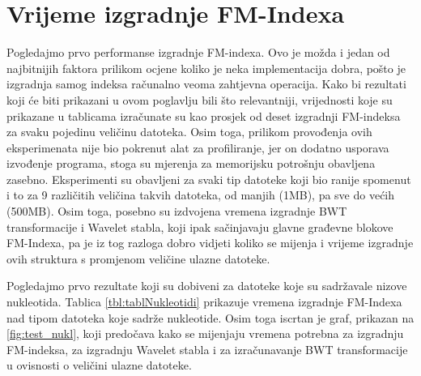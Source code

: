 \section{Vrijeme izgradnje FM-Indexa}
Pogledajmo prvo performanse izgradnje FM-indexa. Ovo je možda i jedan od najbitnijih faktora prilikom ocjene koliko je neka implementacija dobra, pošto je izgradnja samog indeksa računalno veoma zahtjevna operacija. Kako bi rezultati koji će biti prikazani u ovom poglavlju bili što relevantniji, vrijednosti koje su prikazane u tablicama izračunate su kao prosjek od deset izgradnji FM-indeksa za svaku pojedinu veličinu datoteka. Osim toga, prilikom provođenja ovih eksperimenata nije bio pokrenut alat za profiliranje, jer on dodatno usporava izvođenje programa, stoga su mjerenja za memorijsku potrošnju obavljena zasebno. Eksperimenti su obavljeni za svaki tip datoteke koji bio ranije spomenut i to za 9 različitih veličina takvih datoteka, od manjih (1MB), pa sve do većih (500MB). Osim toga, posebno su izdvojena vremena izgradnje BWT transformacije i Wavelet stabla, koji ipak sačinjavaju glavne građevne blokove FM-Indexa, pa je iz tog razloga dobro vidjeti koliko se mijenja i vrijeme izgradnje ovih struktura s promjenom veličine ulazne datoteke.

Pogledajmo prvo rezultate koji su dobiveni za datoteke koje su sadržavale nizove nukleotida. Tablica \ref{tbl:tablNukleotidi} prikazuje vremena izgradnje FM-Indexa nad tipom datoteka koje sadrže nukleotide. Osim toga iscrtan je graf, prikazan na \ref{fig:test_nukl}, koji predočava kako se mijenjaju vremena potrebna za izgradnju FM-indeksa, za izgradnju Wavelet stabla i za izračunavanje BWT transformacije u ovisnosti o veličini ulazne datoteke.

